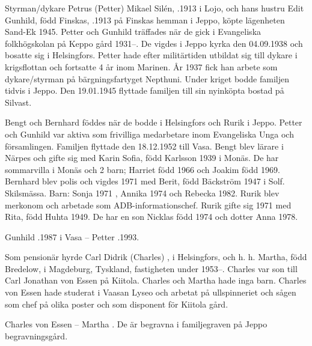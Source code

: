 Styrman/dykare Petrus (Petter) Mikael Silén, .1913 i Lojo, och hans hustru Edit Gunhild, född Finskas, .1913 på Finskas hemman i Jeppo, köpte lägenheten Sand-Ek 1945. Petter och Gunhild träffades när de gick i Evangeliska folkhögskolan på Keppo gård 1931--. De vigdes i Jeppo kyrka den 04.09.1938 och bosatte sig i Helsingfors. Petter hade efter militärtiden utbildat sig till dykare i krigsflottan och fortsatte 4 år inom Marinen. År 1937 fick han arbete som dykare/styrman på bärgningsfartyget Nepthuni. Under kriget bodde familjen tidvis i Jeppo. Den 19.01.1945 flyttade familjen till sin nyinköpta bostad på Silvast.
\begin{jhchildren}
  \item {}
  \item {}
  \item {}
\end{jhchildren}
Bengt och Bernhard föddes när de bodde i Helsingfors och Rurik i Jeppo. Petter och Gunhild var aktiva som frivilliga medarbetare inom Evangeliska Unga och församlingen. Familjen flyttade den 18.12.1952 till Vasa. Bengt blev lärare i Närpes och gifte sig med Karin Sofia, född Karlsson 1939 i  Monäs. De har sommarvilla i Monäs och 2 barn; Harriet född 1966 och Joakim född 1969. Bernhard blev polis och vigdes 1971 med Berit, född Bäckström 1947 i Solf. Skilsmässa. Barn: Sonja 1971 , Annika 1974 och Rebecka 1982. Rurik blev merkonom och arbetade som ADB-informationschef. Rurik gifte sig 1971 med Rita, född Huhta 1949. De har en son Nicklas född 1974 och dotter Anna 1978.

Gunhild .1987 i Vasa  --  Petter .1993.


Som pensionär hyrde Carl Didrik (Charles) ,  i Helsingfors, och h. h. Martha, född Bredelow,  i Magdeburg, Tyskland, fastigheten under 1953--. Charles var son till Carl Jonathan von Essen på Kiitola. Charles och Martha hade inga barn. Charles von Essen hade studerat i Vaasan Lyseo och arbetat på ullspinneriet och sågen som chef på olika poster och som disponent för Kiitola gård.

Charles von Essen   --  Martha . De är begravna i familjegraven på Jeppo begravningsgård.


